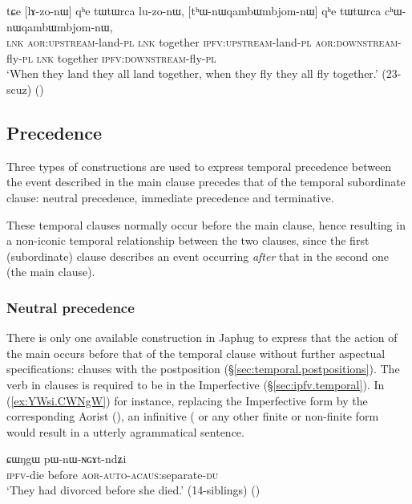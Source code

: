 \begin{exe}
\ex \label{ex:tWtWrca.luzonW2}
\gll tɕe [lɤ-zo-nɯ] qʰe tɯtɯrca lu-zo-nɯ, [tʰɯ-nɯqambɯmbjom-nɯ] qʰe tɯtɯrca cʰɯ-nɯqambɯmbjom-nɯ, \\
\textsc{lnk} \textsc{aor}:\textsc{upstream}-land-\textsc{pl}  \textsc{lnk} together  \textsc{ipfv}:\textsc{upstream}-land-\textsc{pl} \textsc{aor}:\textsc{downstream}-fly-\textsc{pl}  \textsc{lnk} together  \textsc{ipfv}:\textsc{downstream}-fly-\textsc{pl} \\
\glt `When they land they all land together, when they fly they all fly together.' (23-scuz)
()
\end{exe}
 
 
\subsection{Precedence}
Three types of constructions are used to express temporal precedence between the event described in the main clause precedes that of the temporal subordinate clause: neutral precedence, immediate precedence and terminative. 

These temporal clauses normally occur before the main clause, hence resulting in a non-iconic temporal relationship between the two clauses, since the first (subordinate) clause describes an event occurring \textit{after} that in the second one (the main clause).

 \subsubsection{Neutral precedence} \label{sec:precedence.CWNgW}
There is only one available construction in Japhug to express that the action of the main occurs before that of the temporal clause without further aspectual specifications: clauses with the postposition  (§\ref{sec:temporal.postpositions}). The verb in  clauses is required to be in the Imperfective (§\ref{sec:ipfv.temporal}). In (\ref{ex:YWsi.CWNgW}) for instance, replacing the Imperfective form  by the corresponding Aorist (), an infinitive ( or any other finite or non-finite form would result in a utterly agrammatical sentence.

\begin{exe}
\ex \label{ex:YWsi.CWNgW}
\gll [ɲɯ-si] ɕɯŋgɯ pɯ-nɯ-ɴɢɤt-ndʑi  \\
\textsc{ipfv}-die before \textsc{aor}-\textsc{auto}-\textsc{acaus}:separate-\textsc{du} \\
\glt `They had divorced before she died.' (14-siblings)
()
\end{exe}

